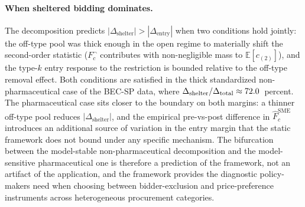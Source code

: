 \paragraph{When sheltered bidding dominates.} The decomposition predicts $|\Delta_{\text{shelter}}| > |\Delta_{\text{entry}}|$ when two conditions hold jointly: the off-type pool was thick enough in the open regime to materially shift the second-order statistic ($F_c^{\neg}$ contributes with non-negligible mass to $\mathbb{E}[c_{(2)}]$), and the type-$k$ entry response to the restriction is bounded relative to the off-type removal effect. Both conditions are satisfied in the thick standardized non-pharmaceutical case of the BEC-SP data, where $\Delta_{\text{shelter}}/\Delta_{\text{total}} \approx 72.0$~percent. The pharmaceutical case sits closer to the boundary on both margins: a thinner off-type pool reduces $|\Delta_{\text{shelter}}|$, and the empirical pre-vs-post difference in $\hat F_c^{\text{SME}}$ introduces an additional source of variation in the entry margin that the static framework does not bound under any specific mechanism. The bifurcation between the model-stable non-pharmaceutical decomposition and the model-sensitive pharmaceutical one is therefore a prediction of the framework, not an artifact of the application, and the framework provides the diagnostic policy-makers need when choosing between bidder-exclusion and price-preference instruments across heterogeneous procurement categories.
